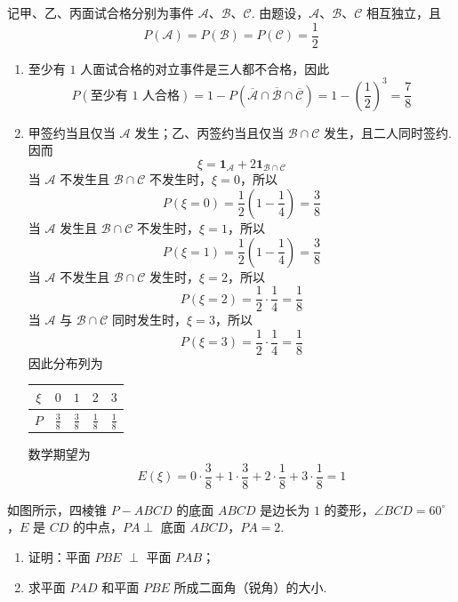 \begin{solution}
记甲、乙、丙面试合格分别为事件 \(\mathcal A\)、\(\mathcal B\)、\(\mathcal C\). 由题设，\(\mathcal A\)、\(\mathcal B\)、\(\mathcal C\) 相互独立，且
\[
P(\mathcal A)=P(\mathcal B)=P(\mathcal C)=\frac12
\]

\begin{enumerate}
\item 至少有 \(1\) 人面试合格的对立事件是三人都不合格，因此
\[
P(\text{至少有 }1\text{ 人合格})
=1-P(\overline{\mathcal A}\cap\overline{\mathcal B}\cap\overline{\mathcal C})
=1-\left(\frac12\right)^3
=\frac78
\]
\item 甲签约当且仅当 \(\mathcal A\) 发生；乙、丙签约当且仅当 \(\mathcal B\cap\mathcal C\) 发生，且二人同时签约. 因而
\[
\xi=\mathbf 1_{\mathcal A}+2\mathbf 1_{\mathcal B\cap\mathcal C}
\]
当 \(\mathcal A\) 不发生且 \(\mathcal B\cap\mathcal C\) 不发生时，\(\xi=0\)，所以
\[
P(\xi=0)=\frac12\left(1-\frac14\right)=\frac38
\]
当 \(\mathcal A\) 发生且 \(\mathcal B\cap\mathcal C\) 不发生时，\(\xi=1\)，所以
\[
P(\xi=1)=\frac12\left(1-\frac14\right)=\frac38
\]
当 \(\mathcal A\) 不发生且 \(\mathcal B\cap\mathcal C\) 发生时，\(\xi=2\)，所以
\[
P(\xi=2)=\frac12\cdot\frac14=\frac18
\]
当 \(\mathcal A\) 与 \(\mathcal B\cap\mathcal C\) 同时发生时，\(\xi=3\)，所以
\[
P(\xi=3)=\frac12\cdot\frac14=\frac18
\]
因此分布列为
\begin{center}
\begin{tabular}{c|cccc}
\(\xi\) & \(0\) & \(1\) & \(2\) & \(3\)\\ \hline
\(P\) & \(\frac38\) & \(\frac38\) & \(\frac18\) & \(\frac18\)
\end{tabular}
\end{center}
数学期望为
\[
E(\xi)=0\cdot\frac38+1\cdot\frac38+2\cdot\frac18+3\cdot\frac18=1
\]
\end{enumerate}
\end{solution}

\begin{problem}
如图所示，四棱锥 \(P - ABCD\) 的底面 \(ABCD\) 是边长为 \(1\) 的菱形，\(\angle BCD = 60^{\circ}\)，\(E\) 是 \(CD\) 的中点，\(PA \perp\) 底面 \(ABCD\)，\(PA = 2\).
\begin{enumerate}
\item 证明：平面 \(PBE\) \(\perp\) 平面 \(PAB\)；
\item 求平面 \(PAD\) 和平面 \(PBE\) 所成二面角（锐角）的大小.
\end{enumerate}
\end{problem}

